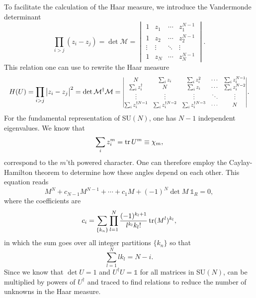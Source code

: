 To facilitate the calculation of the Haar measure, we introduce the Vandermonde
determinant
%
\begin{equation}
  \prod_{i>j} (z_i - z_j) = \det \mathcal{M} =
  \begin{vmatrix}
    1 & z_1 & \cdots & z_1^{N-1} \\
    1 & z_2 & \cdots & z_2^{N-1} \\
    \vdots & \vdots & \ddots & \vdots \\
    1 & z_N & \cdots & z_N^{N-1} 
  \end{vmatrix}.
\end{equation}
%
This relation one can use to rewrite the Haar measure
%
\begin{equation}
  H(U) = \prod_{i>j} \big| z_i - z_j \big|^2
   = \det \mathcal{M}^{\dagger} \mathcal{M} = \scalemath{0.8}{%
  \begin{vmatrix}
    N & \sum_i z_i & \sum_i z_i^2 & \cdots & \sum_i z_i^{N-1} \\
    \sum_i z_i^{\dagger} & N & \sum_i z_i & \cdots & \sum_i z_i^{N-2} \\
    \vdots & \vdots & \vdots & \ddots & \vdots \\
    \sum_i z_i^{\dagger N-1} & \sum_i z_i^{\dagger N-2} & \sum_i z_i^{\dagger N-3} & \cdots & N
  \end{vmatrix}}.
\end{equation}
%
For the fundamental representation of SU$(N)$, one has $N - 1$ independent
eigenvalues. We know that
%
\begin{equation}
  \sum_i z_i^m = \operatorname{tr} U^m \equiv \chi_m,
\end{equation}
%
correspond to the $m$'th powered character. One can therefore employ the
Caylay-Hamilton theorem to determine how these angles depend on each other.
This equation reads
%
\begin{equation} \label{eq-caylay-hamilton}
  M^N + c_{N-1} M^{N-1} + \cdots + c_1 M + (-1)^N \det M\: \mathbb{1}_R = 0,
\end{equation}
%
where the coefficients are
%
\begin{equation}
  c_i = \sum_{\{k_n\}} \prod_{l=1}^N \frac{(-1)^{k_l+1}}{l^{k_l} k_l!}
  \operatorname{tr}(M^l)^{k_l},
\end{equation}
%
in which the sum goes over all integer partitions $\{k_n\}$ so that
%
\begin{equation}
  \sum_{l=1}^N l k_l  = N - i.
\end{equation}
%
Since we know that $\det U = 1$ and $U^{\dagger} U = \mathbb{1}$ for all
matrices in SU$(N)$,  can be multiplied by powers of
$U^{\dagger}$ and traced to find relations to reduce the number of unknowns in
the Haar measure.

